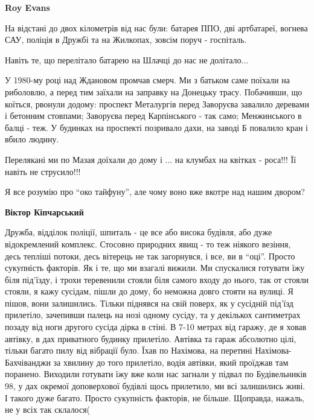 \begin{itemize}
\textbf{Roy Evans} 

На відстані до двох кілометрів від нас були: батарея ППО, дві артбатареї,
вогнева САУ, поліція в Дружбі та на Жилкопах, зовсім поруч - госпіталь.

Навіть те, що перелітало батарею на Шлачці до нас не долітало...

У 1980-му році над Ждановом промчав смерч. Ми з батьком саме поїхали на
риболовлю, а перед тим заїхали на заправку на Донецьку трасу. Побачивши, що
коїться, рвонули додому: проспект Металургів перед Заворуєва завалило деревами
і бетонним стовпами; Заворуєва перед Карпінського - так само; Менжинського в
балці - теж. У будинках на проспекті позривало дахи, на заводі Б повалило кран
і вбило людину.

Перелякані ми по Мазая доїхали до дому і ... на клумбах на квітках - роса!!! Її
навіть не струсило!!!

Я все розумію про \enquote{око тайфуну}, але чому воно вже вкотре над нашим двором?

\textbf{Віктор Кіпчарський} 

Дружба, відділок поліції, шпиталь - це все або висока будівля, або дуже
відокремлений комплекс. Стосовно природних явищ - то теж ніякого везіння, десь
тепліші потоки, десь вітерець не так загорнувся, і все, ви в \enquote{оці}. Просто
сукупність факторів. Як і те, що ми взагалі вижили. Ми спускалися готувати їжу
біля під'їзду, і трохи теревенили стояли біля самого входу до нього, так от
стояли стояли, я кажу сусідам, пішли до дому, бо неможна довго стояти на
вулиці. Я пішов, вони залишились. Тільки піднявся на свій поверх, як у сусідній
під'їзд прилетіло, зачепивши палець на нозі одному сусіду, та у декількох
сантиметрах позаду від ноги другого сусіда дірка в стіні. В 7-10 метрах від
гаражу, де я ховав автівку, в дах приватного будинку прилетіло. Автівка та
гараж абсолютно цілі, тільки багато пилу від вібрації було. Їхав по Нахімова,
на перетині Нахімова-Бахчіванджи за хвилину до того прилетіло, водія автівки,
який проїджав там поранено. Виходили готувати їжу вже коли нас загнали у підвал
по Будівельників 98, у дах окремої доповерхової будівлі щось прилетило, ми всі
залишились живі. І такого дуже багато. Просто сукупність факторів, не більше.
Щоправда, нажаль, не у всіх так склалося(

\end{itemize} %


